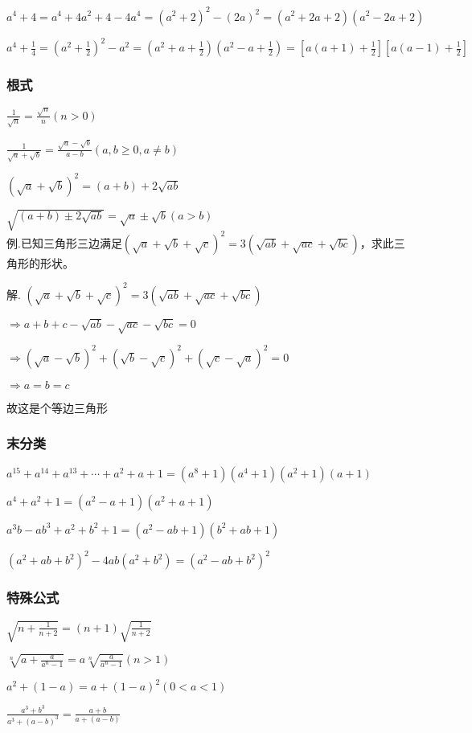 \documentclass[UTF8]{ctexart}
\begin{document}
$a^4+4=a^4+4a^2+4-4a^4=(a^2+2)^2-(2a)^2=(a^2+2a+2)(a^2-2a+2)$

$a^4+\frac{1}{4}=(a^2+\frac{1}{2})^2-a^2=(a^2+a+\frac{1}{2})(a^2-a+\frac{1}{2})=[a(a+1)+\frac{1}{2}][a(a-1)+\frac{1}{2}]$

\subsubsection{根式}

$\frac{1}{\sqrt{n}}=\frac{\sqrt{n}}{n} (n> 0)$

$\frac{1}{\sqrt{a}+\sqrt{b}}=\frac{\sqrt{a}-\sqrt{b}}{a-b}(a,b \ge 0,a\ne b)$

$(\sqrt{a}+\sqrt{b})^2=(a+b)+2\sqrt{ab} $

$\sqrt{(a+b)\pm 2\sqrt{ab}}=\sqrt{a}\pm\sqrt{b} (a> b)$
\\

例.已知三角形三边满足$(\sqrt{a}+\sqrt{b}+\sqrt{c})^2=3(\sqrt{ab}+\sqrt{ac}+\sqrt{bc})$，求此三角形的形状。

解.
$(\sqrt{a}+\sqrt{b}+\sqrt{c})^2=3(\sqrt{ab}+\sqrt{ac}+\sqrt{bc})$

$\Rightarrow a+b+c-\sqrt{ab}-\sqrt{ac}-\sqrt{bc}=0$

$\Rightarrow (\sqrt{a}-\sqrt{b})^2+(\sqrt{b}-\sqrt{c})^2+(\sqrt{c} -\sqrt{a} )^2=0$

$\Rightarrow a=b=c$

故这是个等边三角形

\subsubsection{末分类}

$a^{15}+a^{14}+a^{13}+\cdots +a^2+a+1=(a^8+1)(a^4+1)(a^2+1)(a+1)$

$a^4+a^2+1=(a^2-a+1)(a^2+a+1)$

$a^3b-ab^3+a^2+b^2+1=(a^2-ab+1)(b^2+ab+1)$

$(a^2+ab+b^2)^2-4ab(a^2+b^2)=(a^2-ab+b^2)^2$

\subsubsection{特殊公式}

$\sqrt{n+\frac{1}{n+2}}=(n+1)\sqrt{\frac{1}{n+2}}$

$\sqrt[n]{a+\frac{a}{a^n-1}}=a\sqrt[n]{\frac{a}{a^n-1}} (n> 1)$

$a^2+(1-a)=a+(1-a)^2 (0< a< 1)$

$\frac{a^3+b^3}{a^3+(a-b)^3}=\frac{a+b}{a+(a-b)}$
\end{document}
